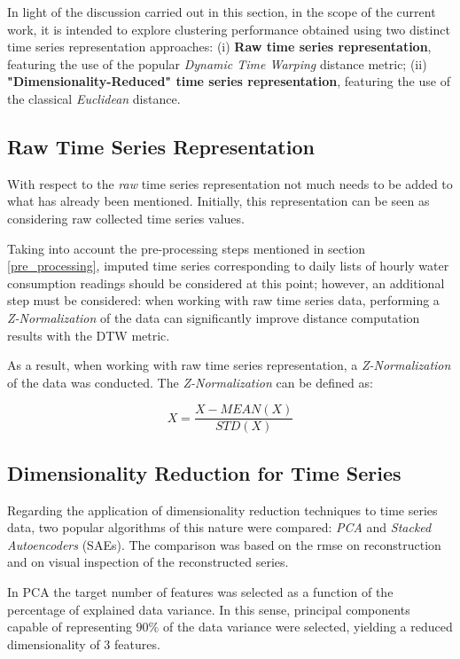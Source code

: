 \documentclass[9pt,journal,compsoc]{IEEEtran}
\begin{document}
In light of the discussion carried out in this section, in the scope of the current work, it is intended to explore clustering performance obtained using two distinct time series representation approaches: (i) \textbf{Raw time series representation}, featuring the use of the popular \emph{Dynamic Time Warping} distance metric; (ii) \textbf{"Dimensionality-Reduced" time series representation}, featuring the use of the classical \emph{Euclidean} distance.

\subsection{Raw Time Series Representation}

With respect to the \emph{raw} time series representation not much needs to be added to what has already been mentioned. Initially, this representation can be seen as considering raw collected time series values.

Taking into account the pre-processing steps mentioned in section \ref{pre_processing}, imputed time series corresponding to daily lists of hourly water consumption readings should be considered at this point; however, an additional step must be considered: when working with raw time series data, performing a \emph{Z-Normalization} of the data can significantly improve distance computation results with the DTW metric\cite{mueen2016extracting}.

As a result, when working with raw time series representation, a \emph{Z-Normalization} of the data was conducted. The \emph{Z-Normalization} can be defined as:

$$X = \frac{X - MEAN(X)}{STD(X)} $$

\subsection{Dimensionality Reduction for Time Series}

Regarding the application of dimensionality reduction techniques to time series data, two popular algorithms of this nature were compared: \emph{PCA} and \emph{Stacked Autoencoders} (SAEs). The comparison was based on the rmse on reconstruction and on visual inspection of the reconstructed series.

In PCA the target number of features was selected as a function of the percentage of explained data variance. In this sense, principal components capable of representing $90\%$ of the data variance were selected, yielding a reduced dimensionality of 3 features.
\end{document}
